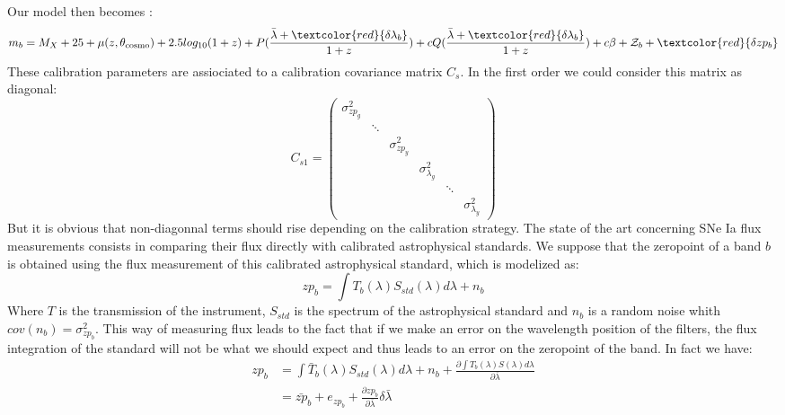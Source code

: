 \documentclass[\docopts]{\docclass}
\begin{document}
Our model then becomes :
\begin{equation}
m_b = M_X + 25 + \mu(z, \theta_\text{cosmo}) + 2.5log_{10}(1+z) + P(\frac{\bar \lambda + \textcolor{red}{\delta\lambda_b}}{1+z}) + cQ(\frac{\bar \lambda + \textcolor{red}{\delta\lambda_b}}{1+z}) + {c\beta} + \mathcal{Z}_b + \textcolor{red}{\delta zp_b}
\end{equation}
These calibration parameters are assiociated to a calibration covariance matrix $C_s$.
In the first order we could consider this matrix as diagonal:
\begin{equation}
C_{s1} = 
\begin{pmatrix}
   \sigma^2_{zp_{g}} & \ & \ & \ & \ & \ \\
   \ & \ddots & \ & \ & \ & \ \\
   \ & \ & \sigma^2_{zp_{y}} & \ & \ & \ \\
   \ & \ & \ & \sigma^2_{\lambda_{g}} & \ & \ \\
   \ & \ & \ & \ & \ddots & \ \\
   \ & \ & \ & \ & \ & \sigma^2_{\lambda_{y}}
\end{pmatrix}
\end{equation}
But it is obvious that non-diagonnal terms should rise depending on the calibration strategy.
The state of the art concerning SNe Ia flux measurements consists in comparing their flux directly with calibrated astrophysical standards.
We suppose that the zeropoint of a band $b$ is obtained using the flux measurement of this calibrated astrophysical standard, which is modelized as:
\begin{equation}
zp_b = \int T_b(\lambda) S_{std}(\lambda) d\lambda + n_b
\end{equation}
Where $T$ is the transmission of the instrument, $S_{std}$ is the spectrum of the astrophysical standard and $n_b$ is a random noise whith $cov(n_b) = \sigma_{zp_b}^2$.
This way of measuring flux leads to the fact that if we make an error on the wavelength position of the filters, the flux integration of the standard will not be what we should expect and thus leads to an error on the zeropoint of the band.
In fact we have:
\begin{equation}
\begin{split}
zp_b &= \int \bar T_b(\lambda) S_{std}(\lambda) d\lambda + n_b + \frac{\partial \int{T_b(\lambda)S(\lambda)d\lambda}}{\partial \bar \lambda}\\
&= \bar{zp}_b + e_{zp_b} + \frac{\partial zp_b}{\partial \bar \lambda}\delta\bar\lambda
\end{split}
\end{equation}
\end{document}
